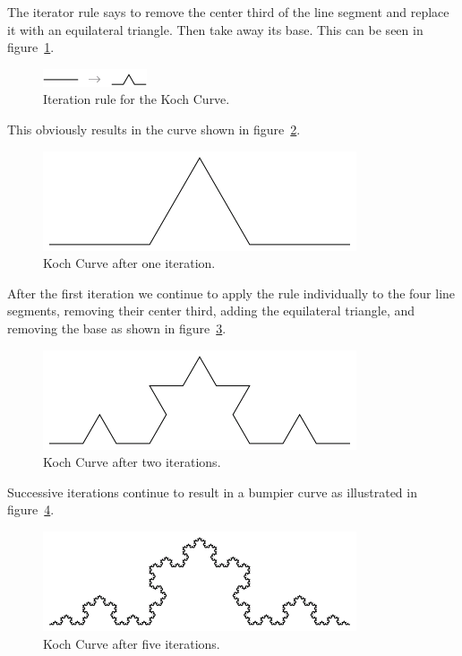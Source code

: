 \documentclass[jou,apacite]{apa6}
\begin{document}
The iterator rule says to remove the center third of the line segment and replace it with an equilateral triangle.  Then take away its base.  This can be seen in figure~\ref{fig:kochiter}.
\begin{figure}[htpb]
  \centering
  \includegraphics[scale=1.0]{images/KochIterationRule.png}
  \caption{Iteration rule for the Koch Curve.}
  \label{fig:kochiter}
\end{figure}
This obviously results in the curve shown in figure~\ref{fig:koch1}.
\begin{figure}[htpb]
  \centering
  \includegraphics[width=0.75\columnwidth]{images/Koch1.png}
  \caption{Koch Curve after one iteration.}
  \label{fig:koch1}
\end{figure}
After the first iteration we continue to apply the rule individually to the four line segments, removing their center third, adding the equilateral triangle, and removing the base as shown in figure~\ref{fig:koch2}.
\begin{figure}[htpb]
  \centering
  \includegraphics[width=0.75\columnwidth]{images/Koch2.png}
  \caption{Koch Curve after two iterations.}
  \label{fig:koch2}
\end{figure}
Successive iterations continue to result in a bumpier curve as illustrated in figure~\ref{fig:koch5}.
\begin{figure}[htpb]
  \centering
  \includegraphics[width=0.75\columnwidth]{images/Koch5.png}
  \caption{Koch Curve after five iterations.}
  \label{fig:koch5}
\end{figure}
\end{document}

